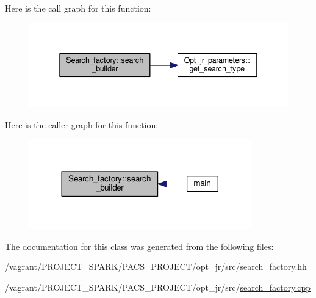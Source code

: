 Here is the call graph for this function\-:
\nopagebreak
\begin{figure}[H]
\begin{center}
\leavevmode
\includegraphics[width=338pt]{classSearch__factory_ae7e40d4a3f4b496d2b35bad43fce44a5_cgraph}
\end{center}
\end{figure}




Here is the caller graph for this function\-:
\nopagebreak
\begin{figure}[H]
\begin{center}
\leavevmode
\includegraphics[width=272pt]{classSearch__factory_ae7e40d4a3f4b496d2b35bad43fce44a5_icgraph}
\end{center}
\end{figure}




The documentation for this class was generated from the following files\-:\begin{DoxyCompactItemize}
\item 
/vagrant/\-P\-R\-O\-J\-E\-C\-T\-\_\-\-S\-P\-A\-R\-K/\-P\-A\-C\-S\-\_\-\-P\-R\-O\-J\-E\-C\-T/opt\-\_\-jr/src/\hyperlink{search__factory_8hh}{search\-\_\-factory.\-hh}\item 
/vagrant/\-P\-R\-O\-J\-E\-C\-T\-\_\-\-S\-P\-A\-R\-K/\-P\-A\-C\-S\-\_\-\-P\-R\-O\-J\-E\-C\-T/opt\-\_\-jr/src/\hyperlink{search__factory_8cpp}{search\-\_\-factory.\-cpp}\end{DoxyCompactItemize}
